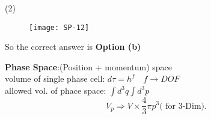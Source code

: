  \begin{tasks}(2)
\end{tasks}
\begin{answer}
	\begin{figure}[H]
		\centering
		\texttt{[image: SP-12]}
	\end{figure}
	So the correct answer is \textbf{Option (b)}
\end{answer}
\textbf{Phase Space}:(Position + momentum) space\\
volume of single phase cell: $d \tau=h^{f} \quad f \rightarrow D O F$\\
allowed vol. of phace space: $\int d^{3} q \int d^{3} p$\\
$$
V_{p} \Rightarrow V \times \frac{4}{3} \pi p^{3}\text{( for 3-Dim).}
$$

 











